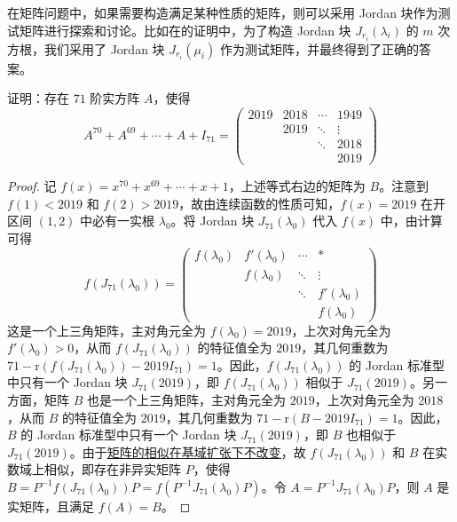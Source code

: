 \documentclass[../../main.tex]{subfiles}
\begin{document}
在矩阵问题中，如果需要构造满足某种性质的矩阵，则可以采用 Jordan 块作为测试矩阵进行探索和讨论。比如在的证明中，为了构造 Jordan 块 $J_{r_i}(\lambda_i)$ 的 $m$ 次方根，我们采用了 Jordan 块 $J_{r_i}(\mu_i)$ 作为测试矩阵，并最终得到了正确的答案。

\begin{example}
证明：存在 $71$ 阶实方阵 $A$，使得
\[
A^{70}+A^{69}+\cdots+A + I_{71}=
\begin{pmatrix}
2019 & 2018 & \cdots & 1949 \\
& 2019 & \ddots & \vdots \\
& & \ddots & 2018 \\
& & & 2019
\end{pmatrix}
\]
\end{example}
\begin{proof}
记 $f(x) = x^{70}+x^{69}+\cdots+x + 1$，上述等式右边的矩阵为 $B$。注意到 $f(1) < 2019$ 和 $f(2) > 2019$，故由连续函数的性质可知，$f(x)=2019$ 在开区间 $(1,2)$ 中必有一实根 $\lambda_0$。将 Jordan 块 $J_{71}(\lambda_0)$ 代入 $f(x)$ 中，由计算可得
\[
f(J_{71}(\lambda_0))=
\begin{pmatrix}
f(\lambda_0) & f'(\lambda_0) & \cdots & * \\
& f(\lambda_0) & \ddots & \vdots \\
& & \ddots & f'(\lambda_0) \\
& & & f(\lambda_0)
\end{pmatrix}
\]
这是一个上三角矩阵，主对角元全为 $f(\lambda_0)=2019$，上次对角元全为 $f'(\lambda_0)>0$，从而 $f(J_{71}(\lambda_0))$ 的特征值全为 $2019$，其几何重数为 $71 - \mathrm{r}(f(J_{71}(\lambda_0)) - 2019I_{71}) = 1$。因此，$f(J_{71}(\lambda_0))$ 的 Jordan 标准型中只有一个 Jordan 块 $J_{71}(2019)$，即 $f(J_{71}(\lambda_0))$ 相似于 $J_{71}(2019)$。另一方面，矩阵 $B$ 也是一个上三角矩阵，主对角元全为 $2019$，上次对角元全为 $2018$，从而 $B$ 的特征值全为 $2019$，其几何重数为 $71 - \mathrm{r}(B - 2019I_{71}) = 1$。因此，$B$ 的 Jordan 标准型中只有一个 Jordan 块 $J_{71}(2019)$，即 $B$ 也相似于 $J_{71}(2019)$。由于\hyperref[corollary:矩阵的相似关系在基域扩张下不变]{矩阵的相似在基域扩张下不改变}，故 $f(J_{71}(\lambda_0))$ 和 $B$ 在实数域上相似，即存在非异实矩阵 $P$，使得 $B = P^{-1}f(J_{71}(\lambda_0))P = f(P^{-1}J_{71}(\lambda_0)P)$。令 $A = P^{-1}J_{71}(\lambda_0)P$，则 $A$ 是实矩阵，且满足 $f(A) = B$。
\end{proof}
\end{document}
